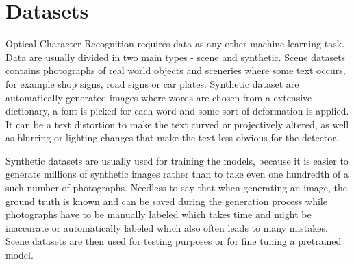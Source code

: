 


\section{Datasets}
\label{sec:datasets}

Optical Character Recognition requires data as any other machine learning task. Data are usually divided in two main types - scene and synthetic. Scene datasets contains photographs of real world objects and sceneries where some text occurs, for example shop signs, road signs or car plates. Synthetic dataset are automatically generated images where words are chosen from a extensive dictionary, a font is picked for each word and some sort of deformation is applied. It can be a text distortion to make the text curved or projectively altered, as well as blurring or lighting changes that make the text less obvious for the detector.

Synthetic datasets are usually used for training the models, because it is easier to generate millions of synthetic images rather than to take even one hundredth of a such number of photographs. Needless to say that when generating an image, the ground truth is known and can be saved during the generation process while photographs have to be manually labeled which takes time and might be inaccurate or automatically labeled which also often leads to many mistakes. Scene datasets are then used for testing purposes or for fine tuning a pretrained model.

